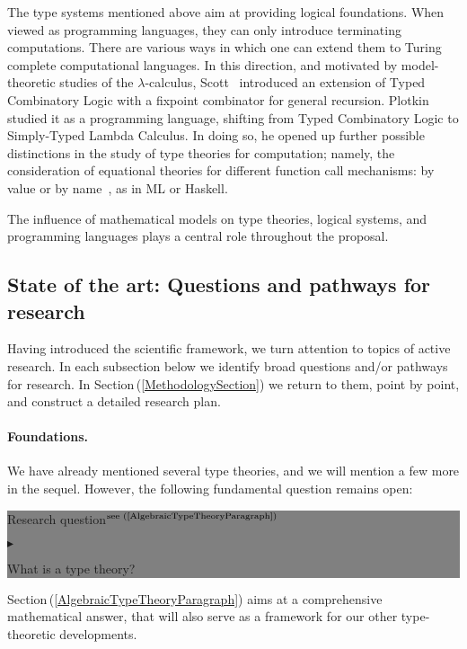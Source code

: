 \documentclass[11pt,twocolumn]{article}
\newenvironment{btritemize}
  {\begin{list}{\btr}
  {\setlength{\topsep}{2pt}
   \setlength{\partopsep}{2pt}
   \setlength{\itemsep}{2.5pt}
   \setlength{\parsep}{2.5pt}
   \setlength{\leftmargin}{1em}
   \setlength{\labelwidth}{.5em}}}
  {\end{list}}
\newcommand{\mytextsf}[1]{\textsf{\small #1}}
\newcommand{\hide}[1]{}
\newcommand{\pref}[1]{\,(\ref{#1})}
\newcommand{\lcalculus}{\mbox{$\lambda$-calculus}}
\newcommand{\btr}{$\blacktriangleright$}
\newcommand{\reqpsize}{8.113395cm}%
\newcommand{\req}[2]{\begin{center}\colorbox{grey}{\begin{minipage}{\reqpsize} 
  \mytextsf{Research question}\hfill$^{\mbox{\scriptsize see #1 }}$\\[-5.5mm]
  \begin{btritemize}
  \item #2
  \end{btritemize}
\end{minipage}}\end{center}}
\begin{document}
The type systems mentioned above aim at providing logical foundations. 
When viewed as programming languages, they can only introduce terminating
computations.  There are various ways in which one can extend them to Turing
complete computational languages.  In this direction, and motivated by
model-theoretic studies of the \lcalculus, Scott~\cite{ScottTCS}
introduced an extension of Typed Combinatory Logic with a fixpoint
combinator for general recursion.  Plotkin~\cite{PlotkinLCF} studied it as a
programming language, shifting from Typed Combinatory Logic to Simply-Typed
Lambda Calculus.  In doing so, he opened up further possible distinctions in
the study of type theories for computation; namely, the consideration of
equational theories for different function call mechanisms: by value or by
name~\cite{PlotkinCBVCBN}, as in ML or Haskell.  

The influence of mathematical models on type theories, logical systems, and
programming languages %
plays a central role throughout the proposal.

\subsection{State of the art: Questions and pathways for research}
\label{StateOfTheArtSubsection}

Having introduced the scientific framework, we turn attention to topics of
active research.  In each subsection below we identify broad questions and/or
pathways for research.  In Section\pref{MethodologySection} we return to them,
point by point, and construct a detailed research plan.

\setcounter{paragraph}{0}
\paragraph{Foundations.}

We have already mentioned several type theories, and we will mention a few
more in the sequel.  However, the following fundamental question
remains open:
\req{(\ref{AlgebraicTypeTheoryParagraph})}
{What is a type theory?}

Section\pref{AlgebraicTypeTheoryParagraph} aims at a comprehensive
mathematical answer, that will also serve as a framework for our other
type-theoretic developments.  
\hide{
  We regard this as a step towards the related open question:
\req{}{What is a programming language?}
that will be kept in the background of our investigations.
}
\end{document}
